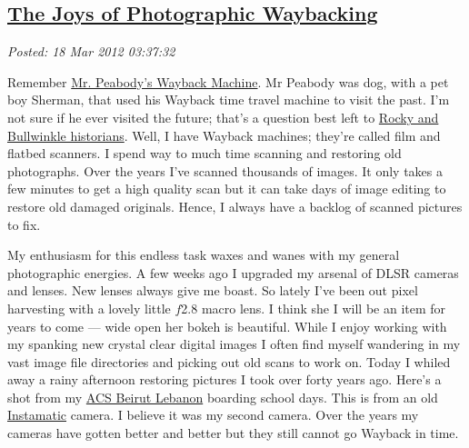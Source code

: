 %

\subsection*{\href{https://bakerjd99.wordpress.com/2012/03/17/the-joys-of-photographic-waybacking/}{The Joys of Photographic Waybacking}}


\noindent\emph{Posted: 18 Mar 2012 03:37:32}
\vspace{6pt}

Remember \href{http://www.youtube.com/watch?v=Kkqn7O1lHFI}{Mr. Peabody's
Wayback Machine}. Mr Peabody was dog, with a pet boy Sherman, that used
his Wayback time travel machine to visit the past. I'm not sure if he
ever visited the future; that's a question best left to
\href{http://www.berkeleyside.com/2009/12/22/berkeley-history-rocky-and-bullwinkle/}{Rocky
and Bullwinkle historians}. Well, I have Wayback machines; they're
called film and flatbed scanners. I spend way to much time scanning and
restoring old photographs. Over the years I've scanned thousands of
images. It only takes a few minutes to get a high quality scan but it
can take days of image editing to restore old damaged originals. Hence,
I always have a backlog of scanned pictures to fix.

My enthusiasm for this endless task waxes and wanes with my general
photographic energies. A few weeks ago I upgraded my arsenal of DLSR
cameras and lenses. New lenses always give me boast. So lately I've been
out pixel harvesting with a lovely little $f$2.8 macro lens. I think she I
will be an item for years to come --- wide open her bokeh is beautiful.
While I enjoy working with my spanking new crystal clear digital images
I often find myself wandering in my vast image file directories and picking
out old scans to work on. Today I whiled away a rainy afternoon
restoring pictures I took over forty years ago. Here's a shot from my
\href{http://en.wikipedia.org/wiki/American\_Community\_School\_at\_Beirut}{ACS
Beirut Lebanon} boarding school days. This is from an old
\href{http://camerapedia.wikia.com/wiki/Instamatic}{Instamatic} camera. I
believe it was my second camera. Over the years my cameras have gotten
better and better but they still cannot go Wayback in time.



